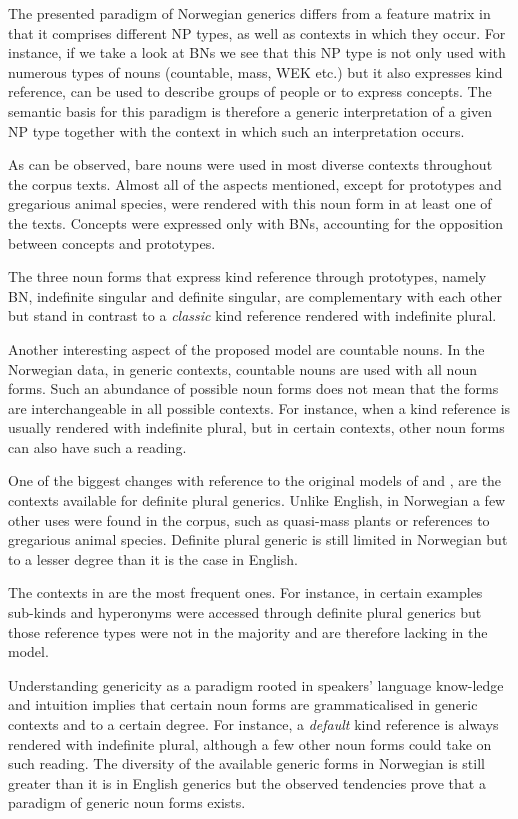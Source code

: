 \documentclass[output=paper]{langsci/langscibook}
\begin{document}
The presented paradigm of Norwegian generics differs from a feature matrix in that it comprises different NP types, as well as contexts in which they occur. For instance, if we take a look at BNs we see that this NP type is not only used with numerous types of nouns (countable, mass, WEK etc.) but it also expresses kind reference, can be used to describe groups of people or to express concepts. The semantic basis for this paradigm is therefore a generic interpretation of a given NP type together with the context in which such an interpretation occurs.


As can be observed, bare nouns were used in most diverse contexts throughout the corpus texts. Almost all of the aspects mentioned, except for prototypes and gregarious animal species, were rendered with this noun form in at least one of the texts. Concepts were expressed only with BNs, accounting for the opposition between concepts and prototypes.

The three noun forms that express kind reference through prototypes, namely BN, indefinite singular and definite singular, are complementary with each other but stand in contrast to a \textit{classic} kind reference rendered with indefinite plural.

Another interesting aspect of the proposed model are countable nouns. In the Norwegian data, in generic contexts, countable nouns are used with all noun forms. Such an abundance of possible noun forms does not mean that the forms are interchangeable in all possible contexts. For instance, when a kind reference is usually rendered with indefinite plural, but in certain contexts, other noun forms can also have such a reading.

One of the biggest changes with reference to the original models of \citet{Radden2007} and \citet{Radden2009}, are the contexts available for definite plural generics. Unlike English, in Norwegian a few other uses were found in the corpus, such as quasi-mass plants or references to gregarious animal species. Definite plural generic is still limited in Norwegian but to a lesser degree than it is the case in English.

The contexts in  are the most frequent ones. For instance, in certain examples sub-kinds and hyperonyms were accessed through definite plural generics but those reference types were not in the majority and are therefore lacking in the model.

\begin{sloppypar}
Understanding genericity as a paradigm rooted in speakers' language know-ledge and intuition implies that certain noun forms are grammaticalised in generic contexts and to a certain degree. For instance, a \textit{default} kind reference is always rendered with indefinite plural, although a few other noun forms could take on such reading. The diversity of the available generic forms in Norwegian is still greater than it is in English generics but the observed tendencies prove that a paradigm of generic noun forms exists.
\end{sloppypar}
\end{document}
